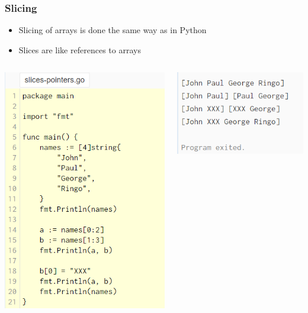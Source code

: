 \documentclass[14pt]{beamer}
\begin{document}
{
\begin{frame}
    \frametitle{Slicing}
    \begin{itemize}
        \item Slicing of arrays is done the same way as in Python
        \item Slices are like references to arrays
    \end{itemize}
    \begin{columns}
        \begin{column}{0.5\textwidth}
        \includegraphics[width=0.7\linewidth]{img/slices.PNG}
        \end{column}
        \begin{column}{0.5\textwidth}
        \includegraphics[width=0.7\linewidth]{img/slicesoutput.PNG}
        \end{column}
    \end{columns}
\end{frame}
}
\end{document}
